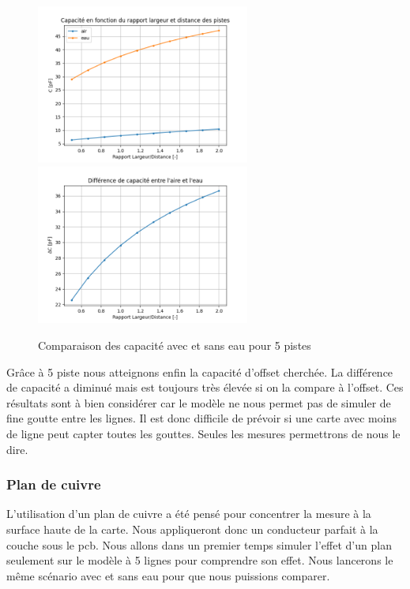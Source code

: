 \begin{figure}[!ht]
 \centering
 \includegraphics[width=7cm]{C5Graph1.png}
 \includegraphics[width=7cm]{C5Graph2.png}
 \caption{Comparaison des capacité avec et sans eau pour 5 pistes}
\end{figure}
\newpage

Grâce à 5 piste nous atteignons enfin la capacité d'offset cherchée. La différence de capacité a diminué mais est toujours très élevée si on la compare à l'offset. Ces résultats sont à bien considérer car le modèle ne nous permet pas de simuler de fine goutte entre les lignes. Il est donc difficile de prévoir si une carte avec moins de ligne peut capter toutes les gouttes. Seules les mesures permettrons de nous le dire. 

\subsubsection{Plan de cuivre}

L'utilisation d'un plan de cuivre a été pensé pour concentrer la mesure à la surface haute de la carte. Nous appliqueront donc un conducteur parfait à la couche sous le pcb. Nous allons dans un premier temps simuler l'effet d'un plan seulement sur le modèle à 5 lignes pour comprendre son effet. Nous lancerons le même scénario avec et sans eau pour que nous puissions comparer.

